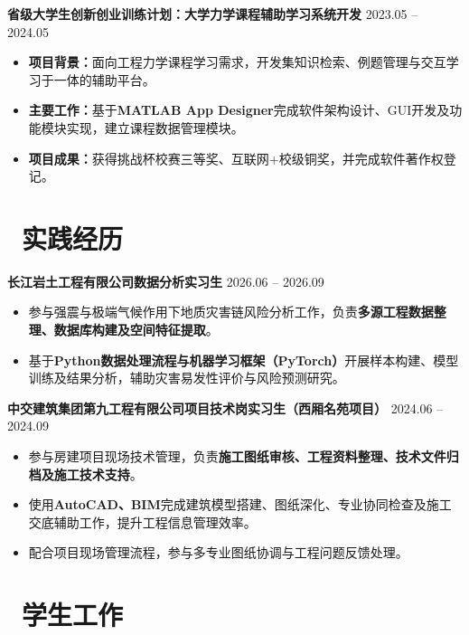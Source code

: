 \documentclass[11pt]{article}
\begin{document}
\textbf{省级大学生创新创业训练计划：大学力学课程辅助学习系统开发}
\hfill 2023.05 -- 2024.05

\begin{itemize}
\item \textbf{项目背景：}面向工程力学课程学习需求，开发集知识检索、例题管理与交互学习于一体的辅助平台。
\item \textbf{主要工作：}基于\textbf{MATLAB App Designer}完成软件架构设计、GUI开发及功能模块实现，建立课程数据管理模块。
\item \textbf{项目成果：}获得挑战杯校赛三等奖、互联网+校级铜奖，并完成软件著作权登记。
\end{itemize}

\section{\makebox[\widthof{\faCogs}][c]{\color{CVBlue}\faCogs}\ 实践经历}

\textbf{长江岩土工程有限公司\hspace{2.5cm}数据分析实习生}
\hfill 2026.06 -- 2026.09

\begin{itemize}
\item 参与强震与极端气候作用下地质灾害链风险分析工作，负责\textbf{多源工程数据整理、数据库构建及空间特征提取}。
\item 基于\textbf{Python数据处理流程与机器学习框架（PyTorch）}开展样本构建、模型训练及结果分析，辅助灾害易发性评价与风险预测研究。
\end{itemize}

\textbf{中交建筑集团第九工程有限公司\hspace{1.2cm}项目技术岗实习生（西厢名苑项目）}
\hfill 2024.06 -- 2024.09

\begin{itemize}
\item 参与房建项目现场技术管理，负责\textbf{施工图纸审核、工程资料整理、技术文件归档及施工技术支持}。
\item 使用\textbf{AutoCAD、BIM}完成建筑模型搭建、图纸深化、专业协同检查及施工交底辅助工作，提升工程信息管理效率。
\item 配合项目现场管理流程，参与多专业图纸协调与工程问题反馈处理。
\end{itemize}

\section{\makebox[\widthof{\faUsers}][c]{\color{CVBlue}\faUsers}\ 学生工作}
\end{document}
